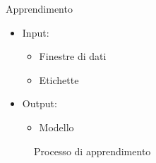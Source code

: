 \begin{tframe}{Apprendimento}

    \begin{minipage}{0.45\textwidth}
        
        \begin{itemize}
            \item Input:
                \begin{itemize}
                    \item Finestre di dati
                    \item Etichette
                \end{itemize}
        \end{itemize}

    \end{minipage}%
    \hfill
    \begin{minipage}{0.55\textwidth}
        
        \begin{itemize}
            \item Output:
                \begin{itemize}
                    \item Modello
                \end{itemize}
        \end{itemize}
        \vspace{3mm}
        
    \end{minipage}%

    \vspace{7mm}

    \begin{figure}
        
        \caption*{Processo di apprendimento}
    \end{figure}

\end{tframe}